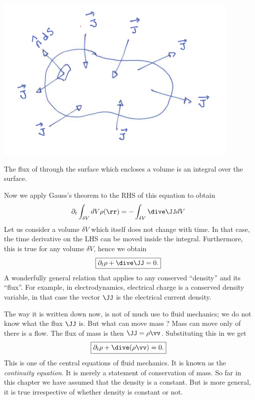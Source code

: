 \begin{marginfigure}
\includegraphics{figures/Jds.png}
\caption{The flux of through the surface which encloses a volume
is an integral over the surface. }
\label{fig:flux}
\end{marginfigure}
Now we apply Gauss's theorem to the RHS of this equation to obtain
\begin{equation}
\partial_t \int_{\delta V} dV \rho(\rr)  = - \int_{\delta V}\dive \JJ dV
\end{equation}
Let us consider a volume $\delta V$ which itself does not change with
time. In that case, the time derivative on the LHS can be moved inside
the integral. Furthermore, this is true for any volume $\delta V$,
hence we obtain
\begin{equation}
\boxed{
\partial_t \rho + \dive \JJ = 0 \/.}
\label{A2.1:conservation}
\end{equation}
A wonderfully general relation that applies to any conserved
``density'' and its ``flux''. For example, in electrodynamics,
electrical charge is a conserved density variable, in that case the
vector $\JJ$ is the electrical current density.

The way it is written down now,  is not of much
use to fluid mechanics; we do not know what the flux $\JJ$ is. But
what can move mass ? Mass can move only of there is a flow. The flux
of mass is then $\JJ = \rho\vv$. Substituting this in
 we get
\begin{equation}
\boxed{
\partial_t \rho + \dive (\rho\vv) = 0 \/.}
\label{A2.1:cont}
\end{equation}
This is one of the central equations of fluid mechanics. 
It is known as the \textit{continuity equation}. 
It is merely a statement of conservation of mass.  So far in this chapter we have
assumed that the density is a constant. But  is more
general, it is true irrespective of whether density is constant or
not. 

